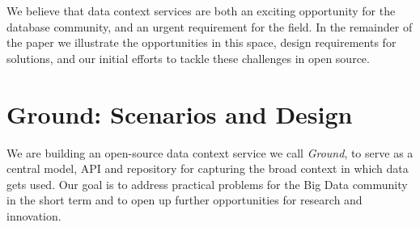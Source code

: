 \documentclass{sig-alternate}
\begin{document}

\smallitembot

We believe that data context services are both an exciting opportunity for the database community, and an urgent requirement for the field.
In the remainder of the paper we illustrate the opportunities in this space, design requirements for solutions, and our initial efforts to tackle these challenges in open source.


\section{Ground: Scenarios and Design}
We are building an open-source data context service we call \emph{Ground}, to serve as a central model, API and repository for capturing the broad context in which data gets used. 
Our goal is to address practical problems for the Big Data community in the short term and to open up further opportunities for research and innovation.
\end{document}
